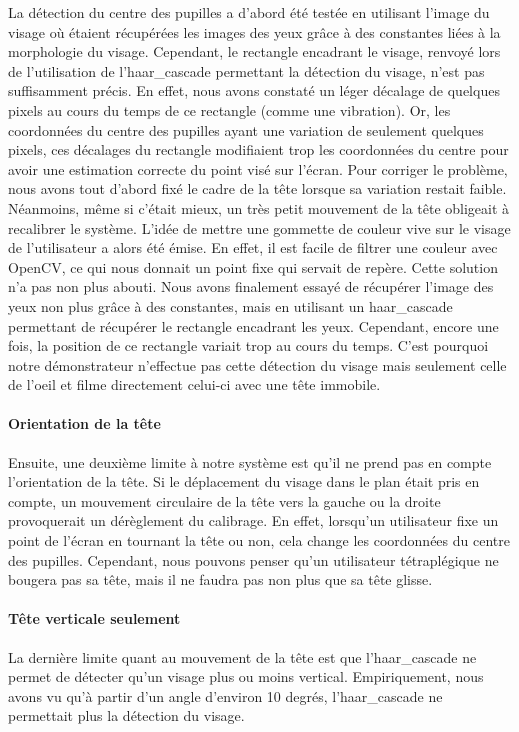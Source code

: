 La détection du centre des pupilles a d’abord été testée en utilisant l’image du visage où étaient récupérées les images des yeux grâce à des constantes liées à la morphologie du visage. Cependant, le rectangle encadrant le visage, renvoyé lors de l’utilisation de l’haar\_cascade permettant la détection du visage, n’est pas suffisamment précis. En effet, nous avons constaté un léger décalage de quelques pixels au cours du temps de ce rectangle (comme une vibration). Or, les coordonnées du centre des pupilles ayant une variation de seulement quelques pixels, ces décalages du rectangle modifiaient trop les coordonnées du centre pour avoir une estimation correcte du point visé sur l’écran. Pour corriger le problème, nous avons tout d'abord fixé le cadre de la tête lorsque sa variation restait faible. Néanmoins, même si c'était mieux, un très petit mouvement de la tête obligeait à recalibrer le système. L'idée de mettre une gommette de couleur vive sur le visage de l'utilisateur a alors été émise. En effet, il est facile de filtrer une couleur avec OpenCV, ce qui nous donnait un point fixe qui servait de repère. Cette solution n'a pas non plus abouti. 
Nous avons finalement essayé de récupérer l’image des yeux non plus grâce à des constantes, mais en utilisant un haar\_cascade permettant de récupérer le rectangle encadrant les yeux. Cependant, encore une fois, la position de ce rectangle variait trop au cours du temps. C’est pourquoi notre démonstrateur n’effectue pas cette détection du visage mais seulement celle de l'oeil et filme directement celui-ci avec une tête immobile.

\paragraph{Orientation de la tête}

Ensuite, une deuxième limite à notre système est qu’il ne prend pas en compte l’orientation de la tête. Si le déplacement du visage dans le plan était pris en compte, un mouvement circulaire de la tête vers la gauche ou la droite provoquerait un dérèglement du calibrage. En effet, lorsqu’un utilisateur fixe un point de l’écran en tournant la tête ou non, cela change les coordonnées du centre des pupilles. Cependant, nous pouvons penser qu’un utilisateur tétraplégique ne bougera pas sa tête, mais il ne faudra pas non plus que sa tête glisse.

\paragraph{Tête verticale seulement}
La dernière limite quant  au mouvement de la tête est que l’haar\_cascade ne permet de détecter qu’un visage plus ou moins vertical. Empiriquement, nous avons vu qu’à partir d’un angle d’environ 10 degrés, l’haar\_cascade ne permettait plus la détection du visage. 

